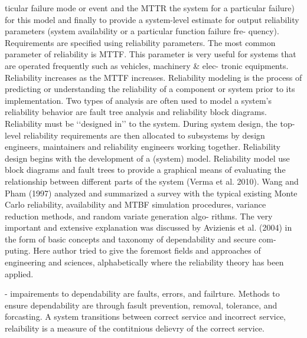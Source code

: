 ticular failure mode or event and the MTTR the system for
a particular failure) for this model and finally to provide a
system-level estimate for output reliability parameters
(system availability or a particular function failure fre-
quency). Requirements are specified using reliability
parameters. The most common parameter of reliability is
MTTF. This parameter is very useful for systems that are
operated frequently such as vehicles, machinery & elec-
tronic equipments. Reliability increases as the MTTF
increases. Reliability modeling is the process of predicting
or understanding the reliability of a component or system
prior to its implementation. Two types of analysis are often
used to model a system’s reliability behavior are fault tree
analysis and reliability block diagrams. Reliability must be
‘‘designed in’’ to the system. During system design, the
top-level reliability requirements are then allocated to
subsystems by design engineers, maintainers and reliability
engineers working together. Reliability design begins with
the development of a (system) model. Reliability model
use block diagrams and fault trees to provide a graphical
means of evaluating the relationship between different
parts of the system (Verma et al. 2010).
Wang and Pham (1997) analyzed and summarized a
survey with the typical existing Monte Carlo reliability,
availability and MTBF simulation procedures, variance
reduction methods, and random variate generation algo-
rithms. The very important and extensive explanation was
discussed by Avizienis et al. (2004) in the form of basic
concepts and taxonomy of dependability and secure com-
puting. Here author tried to give the foremost fields and
approaches of engineering and sciences, alphabetically
where the reliability theory has been applied.




\cite{laprie1996software} - 
impairements to dependability are faults, errors, and failrture. Methods to ensure dependability are through fasult prevention, removal, tolerance, and forcasting. A system transitions between correct service and incorrect service, relaibility is a measure of the contitnious delievry of the correct service.